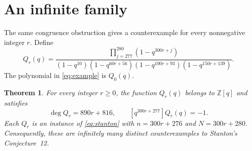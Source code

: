 \documentclass[11pt]{article}
\newtheorem{theorem}{Theorem}
\begin{document}
\section{An infinite family}

The same congruence obstruction gives a counterexample for every
nonnegative integer $r$. Define
\begin{equation}\label{eq:family}
 Q_r(q)=
 \frac{\prod_{j=277}^{280}(1-q^{300r+j})}
 {(1-q^{10})(1-q^{60r+56})(1-q^{100r+93})(1-q^{150r+139})}.
\end{equation}
The polynomial in \eqref{eq:example} is $Q_0(q)$.

\begin{theorem}\label{thm:family}
For every integer $r\geq0$, the function $Q_r(q)$ belongs to
$\mathbb Z[q]$ and satisfies
\[
 \deg Q_r=890r+816,
 \qquad [q^{300r+277}]Q_r(q)=-1.
\]
Each $Q_r$ is an instance of \eqref{eq:stanton} with
$n=300r+276$ and $N=300r+280$. Consequently, these are infinitely many
distinct counterexamples to Stanton's Conjecture~12.
\end{theorem}
\end{document}
